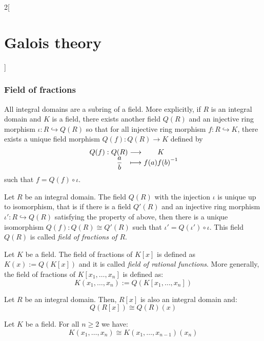 \documentclass[../../../main.tex]{subfiles}
\begin{document}
\begin{multicols}{2}[\section{Galois theory}]
  \subsubsection{Field of fractions}
  \begin{theorem}
    All integral domains are a subring of a field. More explicitly, if $R$ is an integral domain and $K$ is a field, there exists another field $Q(R)$ and an injective ring morphism $\iota:R\hookrightarrow Q(R)$ so that for all injective ring morphism $f:R\hookrightarrow K$, there exists a unique field morphism $Q(f):Q(R)\rightarrow K$ defined by
    $$
      \function{Q(f)}{Q(R)}{K}{\displaystyle\frac{a}{b}}{f(a){f(b)}^{-1}}
    $$
    such that $f=Q(f)\circ\iota$.
  \end{theorem}
  \begin{corollary}
    Let $R$ be an integral domain. The field $Q(R)$ with the injection $\iota$ is unique up to isomorphism, that is if there is a field $Q'(R)$ and an injective ring morphism $\iota':R\hookrightarrow Q(R)$ satisfying the property of above, then there is a unique isomorphism $Q(f):Q(R)\cong Q'(R)$ such that $\iota'=Q(\iota')\circ\iota$. This field $Q(R)$ is called \textit{field of fractions of $R$}.
  \end{corollary}
  \begin{definition}
    Let $K$ be a field. The field of fractions of $K[x]$ is defined as $K(x):=Q(K[x])$ and it is called \textit{field of rational functions}. More generally, the field of fractions of $K[x_1,\ldots,x_n]$ is defined as: $$K(x_1,\ldots,x_n):=Q(K[x_1,\ldots,x_n])$$
  \end{definition}
  \begin{lemma}
    Let $R$ be an integral domain. Then, $R[x]$ is also an integral domain and: $$Q(R[x])\cong Q(R)(x)$$
  \end{lemma}
  \begin{corollary}
    Let $K$ be a field. For all $n\geq 2$ we have: $$K(x_1,\ldots,x_n)\cong K(x_1,\ldots,x_{n-1})(x_n)$$
  \end{corollary}

\end{multicols}
\end{document}
